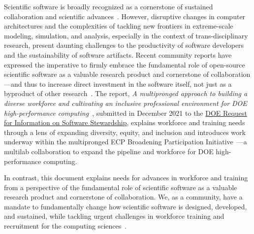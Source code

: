Scientific software is broadly recognized as a cornerstone of sustained collaboration and scientific advances~\cite{siam-cse18,pitac05,CSESSP,
SoftwareProductivityWorkshopReport14}.  However, disruptive changes in computer architectures and the complexities of tackling new frontiers in extreme-scale modeling, simulation, and analysis, especially in the context of trans-disciplinary research, present daunting challenges to the productivity of software developers and the sustainability of software artifacts.
Recent community reports have expressed the imperative to firmly embrace the fundamental role of open-source scientific software as a valuable research product and cornerstone of collaboration—and thus to increase direct investment in the software itself, not just as a byproduct of other research~\cite{ASCAC_report,Hettrick2016,KeyesTaylor2011,KeyesMcInnesWoodwardEtAl13,GroppHarrisonEtAl2016}.
The report, {\em A multipronged approach to building a diverse workforce and cultivating an inclusive professional environment for DOE high-performance computing}~\cite{ECP-broader-engagement:2021-DOE-RFI}, submitted in December 2021 to the \href{https://www.energy.gov/science/articles/department-energy-releases-request-information-software-stewardship}{DOE Request for Information on Software Stewardship}, explains workforce and training needs through a lens of expanding diversity, equity, and inclusion and introduces work underway within the multipronged ECP Broadening Participation Initiative~\cite{ecp-broadening-participation-website2022,ECP-broader-engagement:2021-DOE-RFI}---a multilab collaboration to expand the pipeline and workforce for DOE high-performance computing.


In contrast, this document explains needs for advances in workforce and training from a perspective of the fundamental role of scientific software as a valuable research product and cornerstone of collaboration.  We, as a community, have a mandate to fundamentally change how scientific software is designed, developed, and sustained, while tackling urgent challenges in workforce training and recruitment for the computing sciences~\cite{ascac-workforce2014, demographics-doe-labs, nstc2019, arafune2020, nstc2020, nsf-blueprint2021}.



